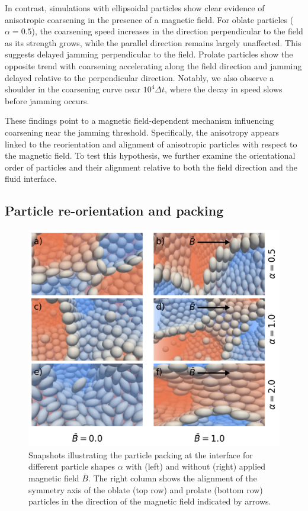 In contrast, simulations with ellipsoidal particles show clear evidence of anisotropic coarsening in the presence of a magnetic field. For oblate 
particles (\(\alpha = 0.5\)), the coarsening speed increases in the direction perpendicular to the field as its strength grows, while the parallel 
direction remains largely unaffected. This suggests delayed jamming perpendicular to the field. Prolate particles show the opposite trend with coarsening 
accelerating along the field direction and jamming delayed relative to the perpendicular direction. Notably, we also observe a shoulder in the coarsening 
curve near \(10^4 \Delta t\), where the decay in speed slows before jamming occurs. 
    
These findings point to a magnetic field-dependent mechanism influencing coarsening near the jamming threshold. Specifically, the anisotropy appears 
linked to the reorientation and alignment of anisotropic particles with respect to the magnetic field. To test this hypothesis, we further examine the 
orientational order of particles and their alignment relative to both the field direction and the fluid interface.
    
\subsection{Particle re-orientation and packing}
    
    \begin{figure}
    \centering
    \includegraphics[width=\columnwidth]{../figures/results/paper1/particle_packing_viz.png}
    \caption{Snapshots illustrating the particle packing at the interface for different particle shapes $\alpha$ with (left)
     and without (right) applied magnetic field $\bar{B}$. The right column shows the alignment of the symmetry axis of the oblate (top row) and prolate (bottom row) 
     particles in the direction of the magnetic field indicated by arrows.}
    \label{fig:packing_viz}
    \end{figure}
    
